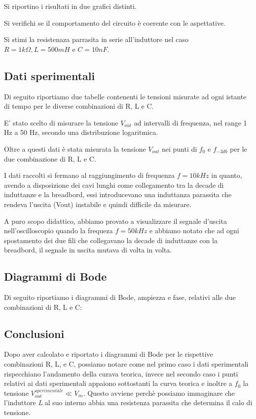 \documentclass{article}
\begin{document}
Si riportino i risultati in due grafici distinti.

Si verifichi se il comportamento del circuito è coerente con le aspettative.

Si stimi la resistenaza parrasita in serie all'induttore nel caso $R = 1 k\Omega, L = 500 mH$ e $C = 10 nF$.

\subsection{Dati sperimentali}
Di seguito riportiamo due tabelle contenenti le tensioni misurate ad ogni istante di tempo per le diverse combinazioni di R, L e C.



E' stato scelto di misurare la tensione \textit{$V_{out}$} ad intervalli di frequenza, nel range 1 Hz a 50 Hz, secondo una distribuzione logaritmica.

Oltre a questi dati è stata misurata la tensione \textit{$V_{out}$} nei punti di $f_0$ e $f_{-3db}$ per le due combinazione di R, L e C. 

I dati raccolti si fermano al raggiungimento di frequenza $f = 10 kHz$ in quanto, avendo a disposizione dei cavi lunghi come collegamento tra la decade di induttanze e la breadbord, essi introducevano una induttanza parassita che rendeva l'uscita (Vout) instabile e quindi difficile da misurare.

A puro scopo didattico, abbiamo provato a visualizzare il segnale d'uscita nell'oscilloscopio quando la frequeza $f = 50 kHz$ e abbiamo notato che ad ogni spostamento dei due fili che collegavano la decade di induttanze con la breadbord, il segnale in uscita mutava di volta in volta.

\subsection{Diagrammi di Bode}
Di seguito riportiamo i diagrammi di Bode, ampiezza e fase, relativi alle due combinazioni di R, L e C:

\subsection{Conclusioni}
Dopo aver calcolato e riportato i diagrammi di Bode per le rispettive combinazioni R, L, e C, possiamo notare come nel primo caso i dati sperimentali rispecchiano l'andamento della curava teorica, invece nel secondo caso i punti relativi ai dati sperimentali appaiono sottostanti la curva teorica e inoltre a $f_0$ la tensione $V_{out}^{sperimentale} \ll V_{in}$. Questo avviene perchè possiamo immaginare che l'induttore \textit{L} al suo interno abbia una resistenza parassita che determina il calo di tensione. 
\end{document}
